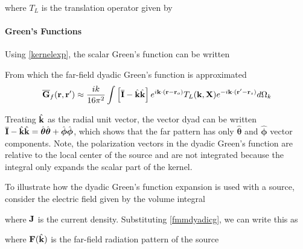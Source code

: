\noindent where $T_L$ is the translation operator given by

\paragraph{Green's Functions}

Using \eqref{kernelexp}, the scalar Green's function can be written  

From which the far-field dyadic Green's function is approximated 
\begin{equation}
 \overline{\mathbf{G}}_f(\mathbf{r},\mathbf{r}') \approx \dfrac{ik}{16\pi^2}  \int \left[\overline{\mathbf{I}} - \hat{\mathbf{k}} \hat{\mathbf{k}} \right]  e^{i\mathbf{k}\cdot(\mathbf{r} - \mathbf{r}_o)} T_L(\mathbf{k},\mathbf{X}) e^{-i\mathbf{k}\cdot(\mathbf{r}' - \mathbf{r}_s) }d\Omega_k  \label{fmmdyadicg}
 \end{equation}

Treating $\hat{\mathbf{k}}$ as the radial unit vector, the vector dyad can be written $\overline{\mathbf{I}} - \hat{\mathbf{k}} \hat{\mathbf{k}} = \hat{\boldsymbol{\theta}}\hat{\boldsymbol{\theta}} + \hat{\boldsymbol{\phi}}\hat{\boldsymbol{\phi}}$, which shows that the far pattern has only $\hat{\boldsymbol{\theta}}$ and $\hat{\boldsymbol{\phi}}$ vector components.  Note, the polarization vectors in the dyadic Green's function are relative to the local center of the source and are not integrated because the integral only expands the scalar part of the kernel.  

To illustrate how the dyadic Green's function expansion is used with a source, consider the electric field given by the volume integral 

\noindent where $\mathbf{J}$ is the current density. Substituting \eqref{fmmdyadicg}, we can write this as

\noindent where $\mathbf{F}(\hat{\mathbf{k}})$ is the far-field radiation pattern of the source

